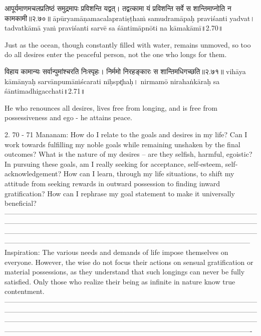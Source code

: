 आपूर्यमाणमचलप्रतिष्ठं समुद्रमापः प्रविशन्ति यद्वत्। 
तद्वत्कामा यं प्रविशन्ति सर्वे स शान्तिमाप्नोति न कामकामी॥२.७०॥
āpūryamāṇamacalapratiṣṭhaṁ samudramāpaḥ praviśanti yadvat। 
tadvatkāmā yaṁ praviśanti sarvē sa śāntimāpnōti na kāmakāmī॥2.70॥

Just as the ocean, though constantly filled with water, remains unmoved, so too do all desires enter the peaceful person, not the one who longs for them.


विहाय कामान्यः सर्वान्पुमांश्चरति निःस्पृहः। 
निर्ममो निरहङ्कारः स शान्तिमधिगच्छति॥२.७१॥
vihāya kāmānyaḥ sarvānpumāṁścarati niḥspr̥haḥ। 
nirmamō nirahaṅkāraḥ sa śāntimadhigacchati॥2.71॥

He who renounces all desires, lives free from longing, and is free from possessiveness and ego - he attains peace. 

2. 70 - 71 Mananam:
How do I relate to the goals and desires in my life? Can I work towards fulfilling my noble goals while remaining unshaken by the final outcomes? What is the nature of my desires – are they selfish, harmful, egoistic?
In pursuing these goals, am I really seeking for acceptance, self-esteem, self-acknowledgement? How can I learn, through my life situations, to shift my attitude from seeking rewards in outward possession to finding inward gratification? How can I rephrase my goal statement to make it universally beneficial?
—------------------------------------------------------------------------------------------------------------------------------------------------------------------------------------------------------------------------------------------------------------------------------------------------------------------------------------------------------------------------------------------------------------------------------------------
Inspiration: 
The various needs and demands of life impose themselves on everyone. However,  the wise do not focus their actions on sensual gratification or material possessions, as they understand that such longings can never be fully satisfied.
Only those who realize their being as infinite in nature know true contentment.
—-------------------------------------------------------------------------------------------------------------------------------------------------------------------------------------------------------------------------------------------------------------------------------------------------------------------------------------------------------------------------------------------------------------------------------------------

